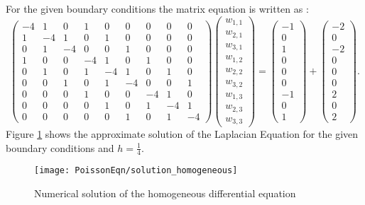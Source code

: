 For the given boundary conditions the matrix equation is written as :
\[\left(\begin{array}{ccccccccc}
-4& 1 & 0 &1 &0 &0 &0 &0 &0\\
1&-4& 1 & 0 &1 &0 &0 &0 &0 \\
0 &1&-4&  0&0 &1 &0 &0 &0 \\
1 &0 &0 &-4& 1 & 0 &1 &0 &0\\
0 & 1 &0 &1&-4& 1 &0 &1 &0  \\
0 &0 &1 &0 &1&-4&0&  0 &1  \\
0&0&0&1 &0 &0 &-4& 1 & 0\\
0&0&0&0 & 1 &0 &1&-4& 1   \\
0&0&0&0 &0 &1 &0 &1&-4
\end{array}\right)
\left(\begin{array}{c}
w_{1,1}\\
w_{2,1}\\
w_{3,1}\\
w_{1,2}\\
w_{2,2}\\
w_{3,2}\\
w_{1,3}\\
w_{2,3}\\
w_{3,3}
\end{array}\right)=
\left(\begin{array}{c}
-1\\
0\\
1\\
0\\
0\\
0\\
-1\\
0\\
1
\end{array}\right)
+\left(\begin{array}{c}
-2\\
0\\
-2\\
0\\
0\\
0\\
2\\
0\\
2
\end{array}\right).
\]	
Figure \ref{SolPossLap} shows the approximate solution of the Laplacian Equation for the given boundary conditions and $h=\frac{1}{4}$.
\begin{figure}[H]
  \caption{Numerical solution of the homogeneous differential equation }\label{SolPossLap}
  \centering
    \texttt{[image: PoissonEqn/solution\_homogeneous]}
\end{figure}

